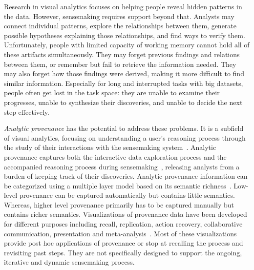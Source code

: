 Research in visual analytics focuses on helping people reveal hidden patterns in the data. However, sensemaking requires support beyond that. Analysts may connect individual patterns, explore the relationships between them, generate possible hypotheses explaining those relationships, and find ways to verify them. Unfortunately, people with limited capacity of working memory cannot hold all of these artifacts simultaneously. They may forget previous findings and relations between them, or remember but fail to retrieve the information needed. They may also forget how those findings were derived, making it more difficult to find similar information. Especially for long and interrupted tasks with big datasets, people often get lost in the task space: they are unable to examine their progresses, unable to synthesize their discoveries, and unable to decide the next step effectively.

\emph{Analytic provenance} has the potential to address these problems. It is a subfield of  visual analytics, focusing on understanding a user's reasoning process through the study of their interactions with the sensemaking system~\cite{North2011}. Analytic provenance captures both the interactive data exploration process and the accompanied reasoning process during sensemaking~\cite{Xu2015}, releasing analysts from a burden of keeping track of their discoveries. Analytic provenance information can be categorized using a multiple layer model based on its semantic richness~\cite{Gotz2009}. Low-level provenance can be captured automatically but contains little semantics. Whereas, higher level provenance primarily has to be captured manually but contains richer semantics. Visualizations of provenance data have been developed for different purposes including recall, replication, action recovery, collaborative communication, presentation and meta-analysis~\cite{Ragan2016}. Most of these visualizations provide post hoc applications of provenance or stop at recalling the process and revisiting past steps. They are not specifically designed to support the ongoing, iterative and dynamic sensemaking process.

